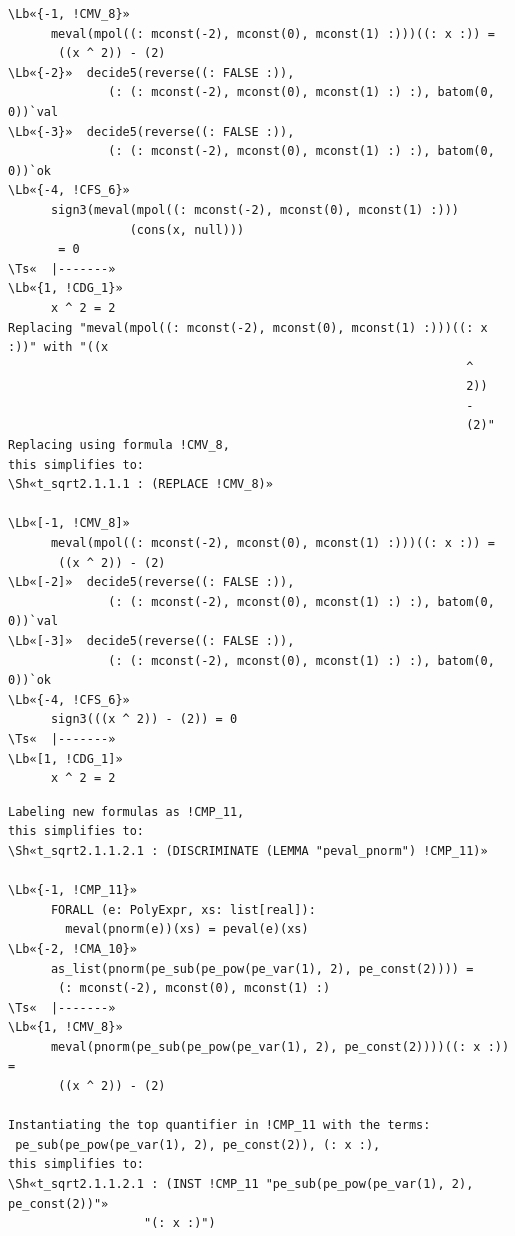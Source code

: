 \documentclass[11pt]{article}
\newcommand\Lb[1]{\textcolor{muted}{#1}}
\newcommand\Ts[1]{\textcolor{muted}{#1}}
\newcommand\Sh[1]{\textcolor{accent}{#1}}
\begin{document}
\begin{enumerate}[leftmargin=1.4em, itemsep=10pt, label=\textbf{\textcolor{accent}{\arabic*}}]
\begin{termbox}
\begin{Verbatim}[commandchars=\\«»]
\Lb«{-1, !CMV_8}»
      meval(mpol((: mconst(-2), mconst(0), mconst(1) :)))((: x :)) =
       ((x ^ 2)) - (2)
\Lb«{-2}»  decide5(reverse((: FALSE :)),
              (: (: mconst(-2), mconst(0), mconst(1) :) :), batom(0, 0))`val
\Lb«{-3}»  decide5(reverse((: FALSE :)),
              (: (: mconst(-2), mconst(0), mconst(1) :) :), batom(0, 0))`ok
\Lb«{-4, !CFS_6}»
      sign3(meval(mpol((: mconst(-2), mconst(0), mconst(1) :)))
                 (cons(x, null)))
       = 0
\Ts«  |-------»
\Lb«{1, !CDG_1}»
      x ^ 2 = 2
Replacing "meval(mpol((: mconst(-2), mconst(0), mconst(1) :)))((: x :))" with "((x
                                                                ^
                                                                2))
                                                                -
                                                                (2)"
Replacing using formula !CMV_8,
this simplifies to:
\Sh«t_sqrt2.1.1.1 : (REPLACE !CMV_8)»

\Lb«[-1, !CMV_8]»
      meval(mpol((: mconst(-2), mconst(0), mconst(1) :)))((: x :)) =
       ((x ^ 2)) - (2)
\Lb«[-2]»  decide5(reverse((: FALSE :)),
              (: (: mconst(-2), mconst(0), mconst(1) :) :), batom(0, 0))`val
\Lb«[-3]»  decide5(reverse((: FALSE :)),
              (: (: mconst(-2), mconst(0), mconst(1) :) :), batom(0, 0))`ok
\Lb«{-4, !CFS_6}»
      sign3(((x ^ 2)) - (2)) = 0
\Ts«  |-------»
\Lb«[1, !CDG_1]»
      x ^ 2 = 2
\end{Verbatim}
\end{termbox}
\begin{termbox}
\begin{Verbatim}[commandchars=\\«»]
Labeling new formulas as !CMP_11,
this simplifies to:
\Sh«t_sqrt2.1.1.2.1 : (DISCRIMINATE (LEMMA "peval_pnorm") !CMP_11)»

\Lb«{-1, !CMP_11}»
      FORALL (e: PolyExpr, xs: list[real]):
        meval(pnorm(e))(xs) = peval(e)(xs)
\Lb«{-2, !CMA_10}»
      as_list(pnorm(pe_sub(pe_pow(pe_var(1), 2), pe_const(2)))) =
       (: mconst(-2), mconst(0), mconst(1) :)
\Ts«  |-------»
\Lb«{1, !CMV_8}»
      meval(pnorm(pe_sub(pe_pow(pe_var(1), 2), pe_const(2))))((: x :)) =
       ((x ^ 2)) - (2)

Instantiating the top quantifier in !CMP_11 with the terms:
 pe_sub(pe_pow(pe_var(1), 2), pe_const(2)), (: x :),
this simplifies to:
\Sh«t_sqrt2.1.1.2.1 : (INST !CMP_11 "pe_sub(pe_pow(pe_var(1), 2), pe_const(2))"»
                   "(: x :)")


\end{Verbatim}
\end{termbox}
\end{enumerate}
\end{document}
